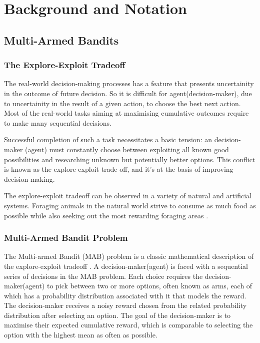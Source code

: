 \chapter{Background and Notation}\label{ch:background}

\section{Multi-Armed Bandits}

\subsection{The Explore-Exploit Tradeoff}
 The real-world decision-making processes has a feature that presents uncertainity 
in the outcome of future decision. 
So it is difficult for agent(decision-maker), due to uncertainity in the result of a given action, to choose the best next action. 
Most of the real-world tasks aiming at maximising cumulative outcomes require to make many sequential decisions.

Successful completion of such a task necessitates a basic tension: an decision-maker (agent) must constantly choose between exploiting all 
known good possibilities and researching unknown but potentially better options. 
This conflict is known as the explore-exploit trade-off, and it's at the basis of improving decision-making.

The explore-exploit tradeoff can be observed in a variety of natural and artificial systems. 
Foraging animals in the natural world strive to consume as much food as possible while also seeking out the most rewarding foraging areas \cite{Keasar:2002}.

\subsection{Multi-Armed Bandit Problem}
 The Multi-armed Bandit (MAB) problem is a classic mathematical description 
of the explore-exploit tradeoff \cite{Robbins:1952}. 
A decision-maker(agent) is faced with a sequential series of decisions in the MAB problem. 
Each choice requires the decision-maker(agent) to pick between two or more options, often known as arms, each of which has a probability distribution associated with it that models the reward. 
The decision-maker receives a noisy reward chosen from the related probability distribution after selecting an option. 
The goal of the decision-maker is to maximise their expected cumulative reward, 
which is comparable to selecting the option with the highest mean as often as possible.
